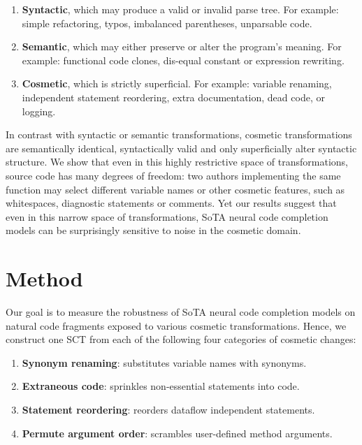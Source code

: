 \documentclass[usenames,dvipsnames]{article} %
\begin{document}
  \begin{enumerate}[itemsep=1ex]
    \item \textbf{Syntactic}, which may produce a valid or invalid parse tree. For example: simple refactoring, typos, imbalanced parentheses, unparsable code.
    \item \textbf{Semantic}, which may either preserve or alter the program's meaning. For example: functional code clones, dis-equal constant or expression rewriting.
    \item \textbf{Cosmetic}, which is strictly superficial. For example: variable renaming, independent statement reordering, extra documentation, dead code, or logging.
  \end{enumerate}

  In contrast with syntactic or semantic transformations, cosmetic transformations are semantically identical, syntactically valid and only superficially alter syntactic structure. We show that even in this highly restrictive space of transformations, source code has many degrees of freedom: two authors implementing the same function may select different variable names or other cosmetic features, such as whitespaces, diagnostic statements or comments.  Yet our results suggest that even in this narrow space of transformations, SoTA neural code completion models can be surprisingly sensitive to noise in the cosmetic domain.

  \section{Method}\label{sec:method}

  Our goal is to measure the robustness of SoTA neural code completion models on natural code fragments exposed to various cosmetic transformations. Hence, we construct one SCT from each of the following four categories of cosmetic changes:

  \begin{enumerate}[itemsep=1ex]
    \item \textbf{Synonym renaming}: substitutes variable names with synonyms.
    \item \textbf{Extraneous code}: sprinkles non-essential statements into code.
    \item \textbf{Statement reordering}: reorders dataflow independent statements.
    \item \textbf{Permute argument order}: scrambles user-defined method arguments.
  \end{enumerate}
\end{document}
